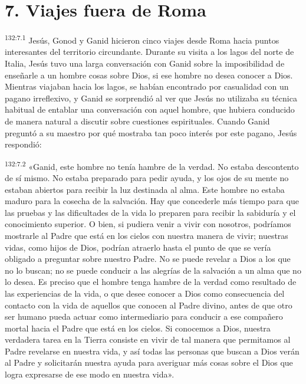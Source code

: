 \section*{7. Viajes fuera de Roma}
\par 
\textsuperscript{132:7.1} Jesús, Gonod y Ganid hicieron cinco viajes desde Roma hacia puntos interesantes del territorio circundante. Durante su visita a los lagos del norte de Italia, Jesús tuvo una larga conversación con Ganid sobre la imposibilidad de enseñarle a un hombre cosas sobre Dios, si ese hombre no desea conocer a Dios. Mientras viajaban hacia los lagos, se habían encontrado por casualidad con un pagano irreflexivo, y Ganid se sorprendió al ver que Jesús no utilizaba su técnica habitual de entablar una conversación con aquel hombre, que hubiera conducido de manera natural a discutir sobre cuestiones espirituales. Cuando Ganid preguntó a su maestro por qué mostraba tan poco interés por este pagano, Jesús respondió:

\par 
\textsuperscript{132:7.2} «Ganid, este hombre no tenía hambre de la verdad. No estaba descontento de sí mismo. No estaba preparado para pedir ayuda, y los ojos de su mente no estaban abiertos para recibir la luz destinada al alma. Este hombre no estaba maduro para la cosecha de la salvación. Hay que concederle más tiempo para que las pruebas y las dificultades de la vida lo preparen para recibir la sabiduría y el conocimiento superior. O bien, si pudiera venir a vivir con nosotros, podríamos mostrarle al Padre que está en los cielos con nuestra manera de vivir; nuestras vidas, como hijos de Dios, podrían atraerlo hasta el punto de que se vería obligado a preguntar sobre nuestro Padre. No se puede revelar a Dios a los que no lo buscan; no se puede conducir a las alegrías de la salvación a un alma que no lo desea. Es preciso que el hombre tenga hambre de la verdad como resultado de las experiencias de la vida, o que desee conocer a Dios como consecuencia del contacto con la vida de aquellos que conocen al Padre divino, antes de que otro ser humano pueda actuar como intermediario para conducir a ese compañero mortal hacia el Padre que está en los cielos. Si conocemos a Dios, nuestra verdadera tarea en la Tierra consiste en vivir de tal manera que permitamos al Padre revelarse en nuestra vida, y así todas las personas que buscan a Dios verán al Padre y solicitarán nuestra ayuda para averiguar más cosas sobre el Dios que logra expresarse de ese modo en nuestra vida».


